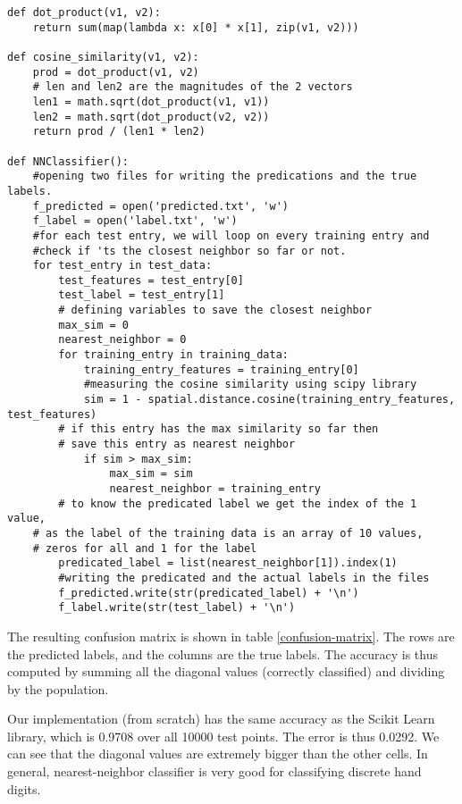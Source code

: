 \begin{lstlisting}[frame=single]
def dot_product(v1, v2):
    return sum(map(lambda x: x[0] * x[1], zip(v1, v2)))

def cosine_similarity(v1, v2):
    prod = dot_product(v1, v2)
    # len and len2 are the magnitudes of the 2 vectors
    len1 = math.sqrt(dot_product(v1, v1))
    len2 = math.sqrt(dot_product(v2, v2))
    return prod / (len1 * len2)

def NNClassifier():
    #opening two files for writing the predications and the true labels.
    f_predicted = open('predicted.txt', 'w')
    f_label = open('label.txt', 'w')
    #for each test entry, we will loop on every training entry and 
    #check if 'ts the closest neighbor so far or not.
    for test_entry in test_data:
        test_features = test_entry[0]    
        test_label = test_entry[1]
        # defining variables to save the closest neighbor
        max_sim = 0  
        nearest_neighbor = 0 
        for training_entry in training_data:
            training_entry_features = training_entry[0]
            #measuring the cosine similarity using scipy library
            sim = 1 - spatial.distance.cosine(training_entry_features, test_features)
	    # if this entry has the max similarity so far then 
	    # save this entry as nearest neighbor
            if sim > max_sim: 
                max_sim = sim 
                nearest_neighbor = training_entry
        # to know the predicated label we get the index of the 1 value, 
	# as the label of the training data is an array of 10 values, 
	# zeros for all and 1 for the label      
        predicated_label = list(nearest_neighbor[1]).index(1)
        #writing the predicated and the actual labels in the files
        f_predicted.write(str(predicated_label) + '\n')
        f_label.write(str(test_label) + '\n')
\end{lstlisting}

The resulting confusion matrix is shown in table \ref{confusion-matrix}. The rows are the predicted labels, and the columns are the true labels. The accuracy is thus computed by summing all the diagonal values (correctly classified) and dividing by the population.

Our implementation (from scratch) has the same accuracy as the Scikit Learn library, which is 0.9708 over all 10000 test points. The error is thus 0.0292. We can see that the diagonal values are extremely bigger than the other cells. In general, nearest-neighbor classifier is very good for classifying discrete hand digits. 

